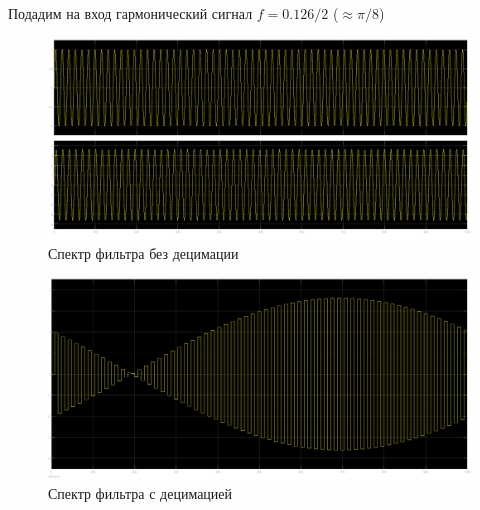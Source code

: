 \documentclass[12pt,a4paper]{article}
\begin{document}
	Подадим на вход гармонический сигнал $f = 0.126/2$ ($\approx \pi/8$)
	\begin{figure}[H]
		\centering
		\includegraphics[width=1.0\linewidth]{res/4_4_inout_0126.png}
		\caption{Спектр фильтра без децимации}
	\end{figure}
	\begin{figure}[H]
		\centering
		\includegraphics[width=1.0\linewidth]{res/4_4_dcm_0126.png}
		\caption{Спектр фильтра с децимацией}
	\end{figure}
\end{document}
